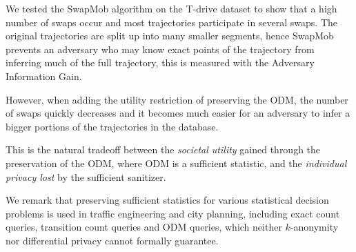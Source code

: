 \documentclass[times,twocolumn,final,authoryear]{elsarticle}
\begin{document}
We tested the SwapMob algorithm on the T-drive dataset to show that a high number of swaps occur and
most trajectories participate in several swaps. The
original trajectories are split up into many smaller segments, hence SwapMob prevents an adversary who may know exact points of the trajectory from inferring much of the full trajectory, this is measured with the Adversary Information Gain.


However, when adding
the utility restriction of preserving the ODM, the number of swaps quickly
decreases and it becomes much easier for an
adversary to infer a bigger portions of the trajectories in the database.

This is the natural tradeoff between the {\em societal utility} gained through the preservation of the ODM, where ODM is a sufficient statistic, and the {\em individual privacy lost} by the sufficient sanitizer.





We remark that preserving sufficient statistics for various statistical decision problems is used in traffic engineering and city planning, including exact count queries, transition count queries and ODM queries, which neither $k$-anonymity nor differential privacy cannot formally guarantee.
\end{document}
